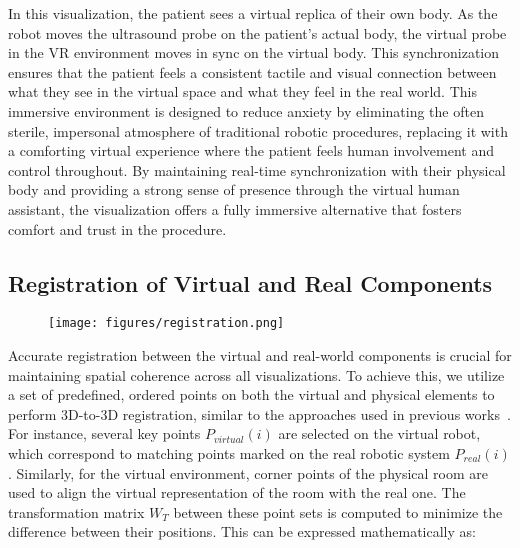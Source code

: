 In this visualization, the patient sees a virtual replica of their own body. As the robot moves the ultrasound probe on the patient’s actual body, the virtual probe in the VR environment moves in sync on the virtual body. This synchronization ensures that the patient feels a consistent tactile and visual connection between what they see in the virtual space and what they feel in the real world.
This immersive environment is designed to reduce anxiety by eliminating the often sterile, impersonal atmosphere of traditional robotic procedures, replacing it with a comforting virtual experience where the patient feels human involvement and control throughout. By maintaining real-time synchronization with their physical body and providing a strong sense of presence through the virtual human assistant, the visualization offers a fully immersive alternative that fosters comfort and trust in the procedure.

\subsection{Registration of Virtual and Real Components}

\begin{figure}
    \centering
    \texttt{[image: figures/registration.png]}
    \caption{}
    \label{fig:registration}
\end{figure}


Accurate registration between the virtual and real-world components is crucial for maintaining spatial coherence across all visualizations. To achieve this, we utilize a set of predefined, ordered points on both the virtual and physical elements to perform 3D-to-3D registration, similar to the approaches used in previous works~\cite{song2022happy,yu2022duplicated}. For instance, several key points $P_{virtual}(i)$ are selected on the virtual robot, which correspond to matching points marked on the real robotic system $P_{real}(i)$. Similarly, for the virtual environment, corner points of the physical room are used to align the virtual representation of the room with the real one. The transformation matrix  $W_T$  between these point sets is computed to minimize the difference between their positions. This can be expressed mathematically as:

